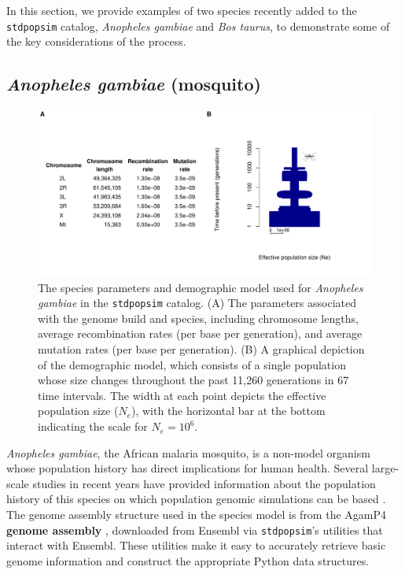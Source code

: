 \documentclass[hidelinks]{article}
\newcommand{\stdpopsim}{\texttt{stdpopsim}\xspace}
\begin{document}
In this section, we provide examples of two species recently added to the \stdpopsim catalog,
\textit{Anopheles gambiae} and \textit{Bos taurus},
to demonstrate some of the key considerations of the process.

\subsection*{\texorpdfstring{\emph{Anopheles gambiae} (mosquito)}{Anopheles gambiae (mosquito)}}
    \label{AnoGam}
    
\begin{figure}[b!]
	\includegraphics[width=\linewidth]{figs/anogam_demog_table}
	\caption{The species parameters and demographic model used for \emph{Anopheles gambiae} in the \stdpopsim catalog.
	(A) The parameters associated with the genome build and species, including
	chromosome lengths, average recombination rates (per base per generation),
	and average mutation rates (per base per generation).
	(B) A graphical depiction of the demographic model,
	which consists of a single population whose size changes throughout the past 11,260 generations in 67 time intervals. The width at each point depicts the effective population size ($N_e$), with the horizontal bar at the bottom indicating the scale for $N_e=10^6$.
		\label{fig:anogam} }
\end{figure}


\emph{Anopheles gambiae}, the African malaria mosquito, is 
a non-model organism whose population history has direct implications for human health.
Several large-scale studies in recent years have provided information about the
population history of this species on which population genomic simulations can be based \citep[e.g.,][]{Miles2017, clarkson2020genome}.
The genome assembly structure used in the species model is from
the AgamP4 \textbf{genome assembly} \citep{Sharakhova2007},
downloaded from Ensembl \citep{ensembl2021} via \stdpopsim's
utilities that interact with Ensembl. These utilities
make it easy to accurately retrieve basic genome information and construct the appropriate Python data structures.
\end{document}
